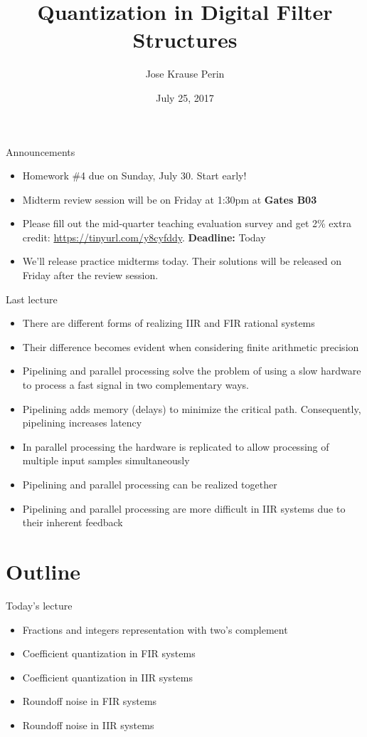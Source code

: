 \documentclass[10pt, handout]{beamer}
\title[EE 264]{Quantization in Digital Filter Structures}
\author{Jose Krause Perin}
\institute{Stanford University}
\date{July 25, 2017}
\begin{document}
\begin{frame}
  \titlepage
\end{frame}

%
\begin{frame}{Announcements}
	\begin{itemize}
		\item Homework \#4 due on Sunday, July 30. Start early!
		\item Midterm review session will be on Friday at 1:30pm at \textbf{Gates B03}
		\item Please fill out the mid-quarter teaching evaluation survey and get 2\% extra credit: \url{https://tinyurl.com/y8cyfddy}. \textbf{Deadline:} Today
		\item We'll release practice midterms today. Their solutions will be released on Friday after the review session.
	\end{itemize}
\end{frame}

%
\begin{frame}{Last lecture}
\begin{itemize}
	\item There are different forms of realizing IIR and FIR rational systems
	\item Their difference becomes evident when considering finite arithmetic precision
	\item Pipelining and parallel processing solve the problem of using a slow hardware to process a fast signal in two complementary ways. 
	\item Pipelining adds memory (delays) to minimize the critical path. Consequently, pipelining increases latency
	\item In parallel processing the hardware is replicated to allow processing of multiple input samples simultaneously
	\item Pipelining and parallel processing can be realized together
	\item Pipelining and parallel processing are more difficult in IIR systems due to their inherent feedback
\end{itemize}
\end{frame}

%
\section{Outline}
\begin{frame}{Today's lecture}	
	\begin{itemize}
		\item Fractions and integers representation with two's complement
		\item Coefficient quantization in FIR systems
		\item Coefficient quantization in IIR systems
		\item Roundoff noise in FIR systems
		\item Roundoff noise in IIR systems
	\end{itemize}
\end{frame}
\end{document}

